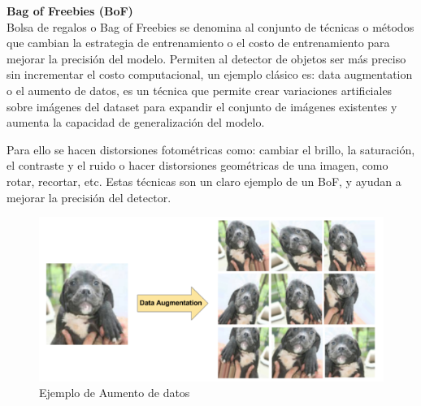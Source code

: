 \textbf{Bag of Freebies (BoF)} \\

Bolsa de regalos o Bag of Freebies se denomina al conjunto de técnicas o métodos que cambian la estrategia de entrenamiento o el costo de entrenamiento para mejorar la precisión del modelo. Permiten al detector de objetos ser más preciso sin incrementar el costo computacional, un ejemplo clásico es: data augmentation o el aumento de datos, es un técnica que permite crear variaciones artificiales sobre imágenes del dataset para expandir el conjunto de imágenes existentes y aumenta la capacidad de generalización del modelo.

Para ello se hacen distorsiones fotométricas como: cambiar el brillo, la saturación, el contraste y el ruido o hacer distorsiones geométricas de una imagen, como rotar, recortar, etc. Estas técnicas son un claro ejemplo de un BoF, y ayudan a mejorar la precisión del detector.

\begin{figure}[h!]
    \centering
    \includegraphics[width=1\textwidth]{img/dataAugmentation.png}
    \caption{Ejemplo de Aumento de datos \cite{dataaug}}
    \label{fig:data-augmentation-ejemplo}
\end{figure}

